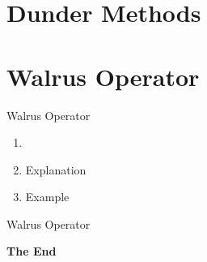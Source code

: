\documentclass[aspectratio=169,xcolor=dvipsnames]{beamer}
\begin{document}
\section{Dunder Methods}

\section{Walrus Operator}

\begin{frame}{Walrus Operator}
    \begin{enumerate}
        \item
        \item Explanation
        \item Example
    \end{enumerate}
\end{frame}

\begin{frame}{Walrus Operator}
  \begin{example}
  
  \end{example}
\end{frame}


\begin{frame}
    \Huge{\centerline{\textbf{The End}}}
\end{frame}

\end{document}

